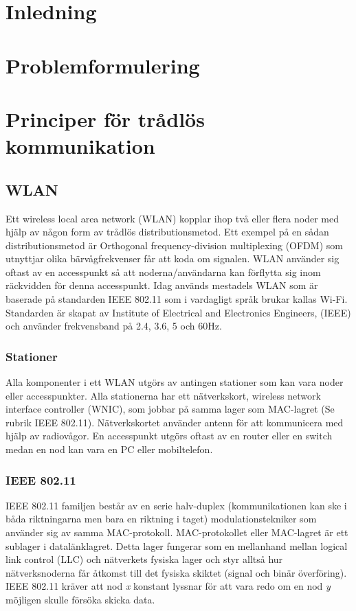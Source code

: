 \documentclass[a4paper,12pt,fleqn]{article}
\begin{document}
\addto\captionsswedish{\renewcommand{\contentsname}{Innehållsförteckning}}

\tableofcontents
\thispagestyle{fancy}
\newpage

\section{Inledning}
\section{Problemformulering}
\section{Principer för trådlös kommunikation}
\subsection{WLAN}
Ett wireless local area network (WLAN) kopplar ihop två eller flera noder med hjälp av någon form av trådlös distributionsmetod. Ett exempel på en sådan distributionsmetod är Orthogonal frequency-division multiplexing (OFDM) som utnyttjar olika bärvågfrekvenser får att koda om signalen. WLAN använder sig oftast av en accesspunkt så att noderna/användarna kan förflytta sig inom räckvidden för denna accesspunkt. Idag används mestadels WLAN som är baserade på standarden IEEE 802.11 som i vardagligt språk brukar kallas Wi-Fi. Standarden är skapat av Institute of Electrical and Electronics Engineers, (IEEE) och använder frekvensband på 2.4, 3.6, 5 och 60Hz.

\subsubsection{Stationer}
Alla komponenter i ett WLAN utgörs av antingen stationer som kan vara noder eller accesspunkter. Alla stationerna har ett nätverkskort, wireless network interface controller (WNIC), som jobbar på samma lager som MAC-lagret (Se rubrik IEEE 802.11). Nätverkskortet använder antenn för att kommunicera med hjälp av radiovågor. En accesspunkt utgörs oftast av en router eller en switch medan en nod kan vara en PC eller mobiltelefon. 

\subsubsection{IEEE 802.11}
IEEE 802.11 familjen består av en serie halv-duplex (kommunikationen kan ske i båda riktningarna men bara en riktning i taget) modulationstekniker som använder sig av samma MAC-protokoll. MAC-protokollet eller MAC-lagret är ett sublager i datalänklagret. Detta lager fungerar som en mellanhand mellan logical link control (LLC) och nätverkets fysiska lager och styr alltså hur nätverksnoderna får åtkomst till det fysiska skiktet (signal och binär överföring).
IEEE 802.11 kräver att nod \emph{x} konstant lyssnar för att vara redo om en nod \emph{y} möjligen skulle försöka skicka data. 
\end{document}
